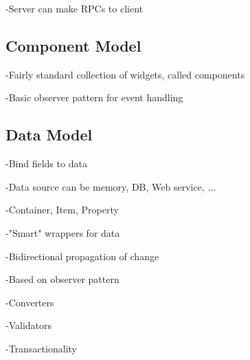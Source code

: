 -Server can make RPCs to client

\subsection{Component Model}

-Fairly standard collection of widgets, called components

-Basic observer pattern for event handling

\subsection{Data Model}

-Bind fields to data

-Data source can be memory, DB, Web service, ...

-Container, Item, Property

-"Smart" wrappers for data

-Bidirectional propagation of change

-Based on observer pattern

-Converters

-Validators

-Transactionality


